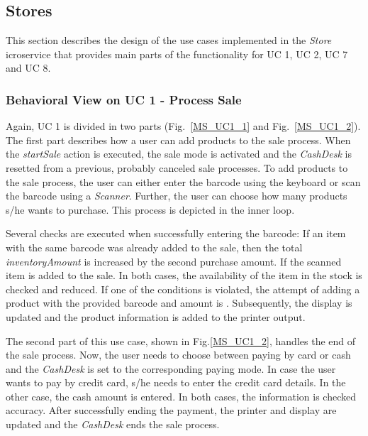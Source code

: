 		\FloatBarrier
			
		\subsection{Stores}
			This section describes the design of the use cases implemented in the \textit{Store} icroservice that provides main parts of the functionality for UC 1, UC 2, UC 7 and UC 8.

		\subsubsection*{Behavioral View on UC 1 - Process Sale} 
		Again, UC 1 is divided in two parts (Fig.~\ref{MS_UC1_1} and Fig.~\ref{MS_UC1_2}).
		The first part describes how a user can add products to the sale process. When the \textit{startSale} action is executed, the sale mode is activated and the \textit{CashDesk} is resetted from a previous, probably canceled sale processes. To add products to the sale process, the user can either enter the barcode  using the keyboard or scan the barcode using a \textit{Scanner}. Further, the user can choose how many products s/he wants to purchase. This process is depicted in the inner loop. 
		
		Several checks are executed when successfully entering the barcode: 
		If an item with the same barcode was already added to the sale, then the total \textit{inventoryAmount} is increased by the second purchase amount. 
		If the scanned item is added to the sale.
		In both cases, the availability of the item in the stock is checked and reduced. 
		If one of the conditions is violated, the attempt of adding a product with the provided barcode and amount is . 
		Subsequently, the display is updated and the product information is added to the printer output.
		
		The second part of this use case, shown in Fig.\added{~}\ref{MS_UC1_2}, handles the end of the sale process. 
		Now, the user needs to choose between paying by card or cash and the \textit{CashDesk} is set to the corresponding paying mode. 
		In case the user wants to pay by credit card, s/he needs to enter the credit card details. 
		In the other case, the cash amount is entered. 
		In both cases, the information is checked  accuracy.
		After successfully ending the payment, the printer and display are updated and the \textit{CashDesk} ends the sale process.

